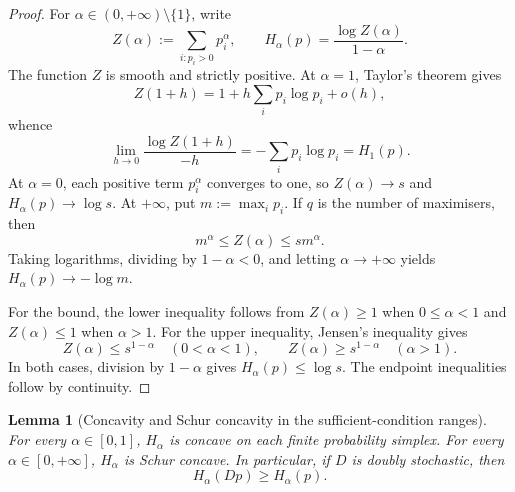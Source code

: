 \documentclass[aps,pra,11pt,onecolumn,nofootinbib,tightenlines]{revtex4-2}
\newtheorem{lemma}[theorem]{Lemma}
\theoremstyle{definition}
\begin{document}
\begin{proof}
For $\alpha\in(0,+\infty)\setminus\{1\}$, write
\begin{equation}
 Z(\alpha):=\sum_{i:p_i>0}p_i^\alpha,
 \qquad
 H_\alpha(p)=\frac{\log Z(\alpha)}{1-\alpha}.
 \label{eq:app-Z-alpha}
\end{equation}
The function $Z$ is smooth and strictly positive.  At $\alpha=1$, Taylor's theorem gives
\begin{equation}
 Z(1+h)=1+h\sum_ip_i\log p_i+o(h),
 \label{eq:app-Z-near-one}
\end{equation}
whence
\begin{equation}
 \lim_{h\to0}\frac{\log Z(1+h)}{-h}
 =-\sum_ip_i\log p_i=H_1(p).
 \label{eq:app-renyi-to-Shannon}
\end{equation}
At $\alpha=0$, each positive term $p_i^\alpha$ converges to one, so $Z(\alpha)\to s$ and $H_\alpha(p)\to\log s$.  At $+\infty$, put $m:=\max_i p_i$.  If $q$ is the number of maximisers, then
\begin{equation}
 m^\alpha\leq Z(\alpha)\leq s m^\alpha.
 \label{eq:app-Z-infinity-squeeze}
\end{equation}
Taking logarithms, dividing by $1-\alpha<0$, and letting $\alpha\to+\infty$ yields $H_\alpha(p)\to-\log m$.

For the bound, the lower inequality follows from $Z(\alpha)\geq1$ when $0\leq\alpha<1$ and $Z(\alpha)\leq1$ when $\alpha>1$.  For the upper inequality, Jensen's inequality gives
\begin{equation}
 Z(\alpha)\leq s^{1-\alpha}
 \quad(0<\alpha<1),
 \qquad
 Z(\alpha)\geq s^{1-\alpha}
 \quad(\alpha>1).
 \label{eq:app-Z-uniform-bound}
\end{equation}
In both cases, division by $1-\alpha$ gives $H_\alpha(p)\leq\log s$.  The endpoint inequalities follow by continuity.
\end{proof}

\begin{lemma}[Concavity and Schur concavity in the sufficient-condition ranges]
\label{lem:app-renyi-shape}
For every $\alpha\in[0,1]$, $H_\alpha$ is concave on each finite probability simplex.  For every $\alpha\in[0,+\infty]$, $H_\alpha$ is Schur concave.  In particular, if $D$ is doubly stochastic, then
\begin{equation}
 H_\alpha(Dp)\geq H_\alpha(p).
 \label{eq:app-Schur-DS}
\end{equation}
\end{lemma}
\end{document}
